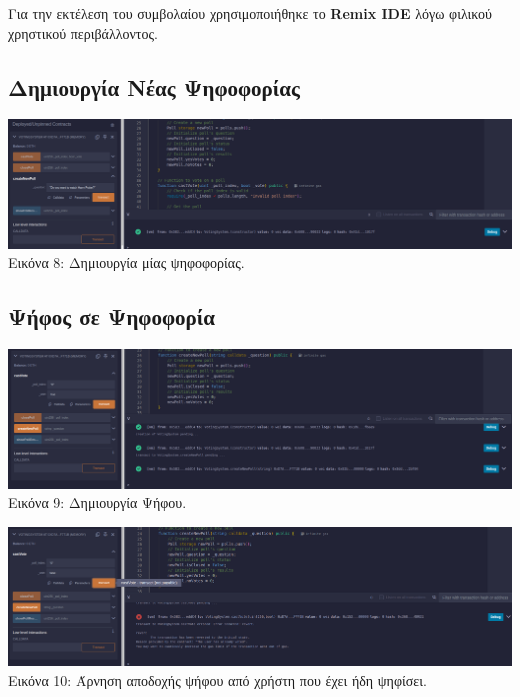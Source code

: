\documentclass[12pt]{article}
\begin{document}
    Για την εκτέλεση του συμβολαίου χρησιμοποιήθηκε το \textbf{Remix IDE} λόγω φιλικού χρηστικού περιβάλλοντος.
    
    \subsection{Δημιουργία Νέας Ψηφοφορίας}
    
    \begin{center}
        \includegraphics[width=\linewidth, keepaspectratio]{images/ss_create_new_poll.png}
        Εικόνα 8: Δημιουργία μίας ψηφοφορίας.
    \end{center}
    
    \subsection{Ψήφος σε Ψηφοφορία}
    
    \begin{center}
        \includegraphics[width=\linewidth, keepaspectratio]{images/ss_cast_vote.png}
        Εικόνα 9: Δημιουργία Ψήφου.
    \end{center}
    
    \begin{center}
        \includegraphics[width=\linewidth, keepaspectratio]{images/ss_cast_vote_denied.png}
        Εικόνα 10: Άρνηση αποδοχής ψήφου από χρήστη που έχει ήδη ψηφίσει.
    \end{center}
    
\end{document}
